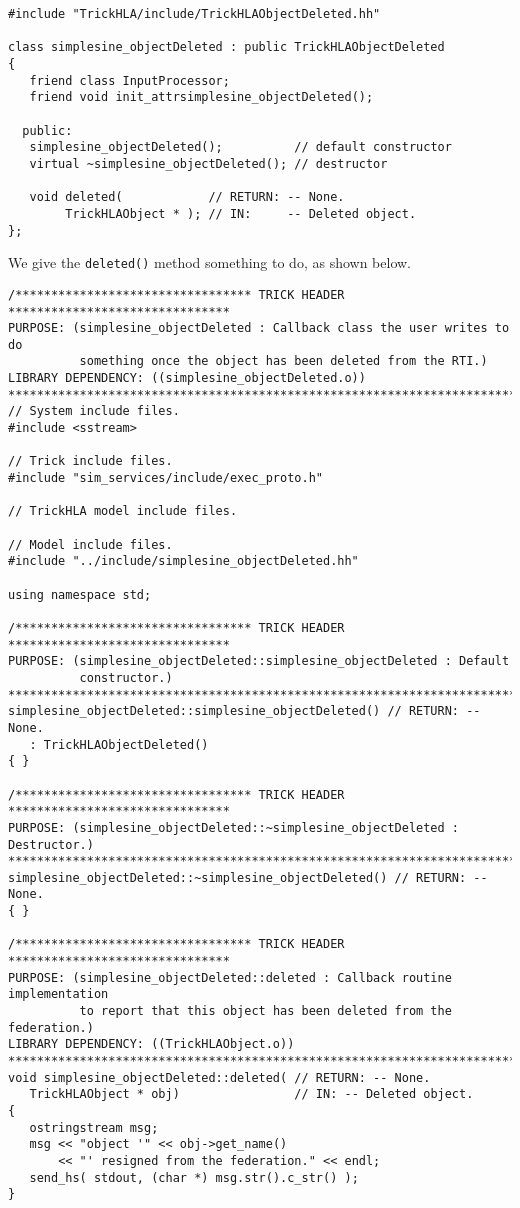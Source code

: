 \begin{lstlisting}[caption={{\tt simplesine\_objectDeleted} class header}]
#include "TrickHLA/include/TrickHLAObjectDeleted.hh"

class simplesine_objectDeleted : public TrickHLAObjectDeleted
{
   friend class InputProcessor;
   friend void init_attrsimplesine_objectDeleted();

  public:
   simplesine_objectDeleted();          // default constructor
   virtual ~simplesine_objectDeleted(); // destructor

   void deleted(            // RETURN: -- None.
        TrickHLAObject * ); // IN:     -- Deleted object.
};
\end{lstlisting}

We give the {\tt deleted()} method something to do, as shown below.

\begin{lstlisting}[caption={ {\tt simplesine\_objectDeleted} code}]
/********************************* TRICK HEADER *******************************
PURPOSE: (simplesine_objectDeleted : Callback class the user writes to do
          something once the object has been deleted from the RTI.)
LIBRARY DEPENDENCY: ((simplesine_objectDeleted.o))
*******************************************************************************/
// System include files.
#include <sstream>

// Trick include files.
#include "sim_services/include/exec_proto.h"

// TrickHLA model include files.

// Model include files.
#include "../include/simplesine_objectDeleted.hh"

using namespace std;

/********************************* TRICK HEADER *******************************
PURPOSE: (simplesine_objectDeleted::simplesine_objectDeleted : Default 
          constructor.)
*******************************************************************************/
simplesine_objectDeleted::simplesine_objectDeleted() // RETURN: -- None.
   : TrickHLAObjectDeleted()
{ }

/********************************* TRICK HEADER *******************************
PURPOSE: (simplesine_objectDeleted::~simplesine_objectDeleted : Destructor.)
*******************************************************************************/
simplesine_objectDeleted::~simplesine_objectDeleted() // RETURN: -- None.
{ }

/********************************* TRICK HEADER *******************************
PURPOSE: (simplesine_objectDeleted::deleted : Callback routine implementation
          to report that this object has been deleted from the federation.)
LIBRARY DEPENDENCY: ((TrickHLAObject.o))
*******************************************************************************/
void simplesine_objectDeleted::deleted( // RETURN: -- None.
   TrickHLAObject * obj)                // IN: -- Deleted object.
{
   ostringstream msg;
   msg << "object '" << obj->get_name()
       << "' resigned from the federation." << endl;
   send_hs( stdout, (char *) msg.str().c_str() );
}
\end{lstlisting}


